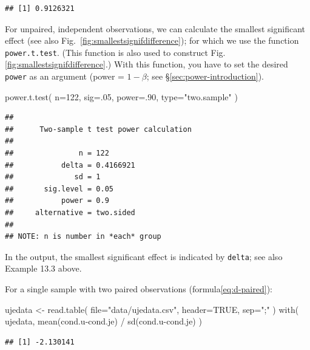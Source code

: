 \documentclass[
]{book}
\newenvironment{Shaded}{\begin{snugshade}}{\end{snugshade}}
\newcommand{\AttributeTok}[1]{\textcolor[rgb]{0.77,0.63,0.00}{#1}}
\newcommand{\ConstantTok}[1]{\textcolor[rgb]{0.00,0.00,0.00}{#1}}
\newcommand{\DecValTok}[1]{\textcolor[rgb]{0.00,0.00,0.81}{#1}}
\newcommand{\FunctionTok}[1]{\textcolor[rgb]{0.00,0.00,0.00}{#1}}
\newcommand{\NormalTok}[1]{#1}
\newcommand{\OtherTok}[1]{\textcolor[rgb]{0.56,0.35,0.01}{#1}}
\newcommand{\SpecialCharTok}[1]{\textcolor[rgb]{0.00,0.00,0.00}{#1}}
\newcommand{\StringTok}[1]{\textcolor[rgb]{0.31,0.60,0.02}{#1}}
\begin{document}
\begin{verbatim}
## [1] 0.9126321
\end{verbatim}

For unpaired, independent observations, we can calculate the smallest
significant effect (see also
Fig.~\ref{fig:smallestsignifdifference}); for which we use the function
\texttt{power.t.test}. (This function is
also used to construct Fig.\ref{fig:smallestsignifdifference}.)
With this function, you have to set the desired \texttt{power} as
an argument (power = \(1-\beta\); see
§\ref{sec:power-introduction}).

\begin{Shaded}
\begin{Highlighting}[]
\FunctionTok{power.t.test}\NormalTok{( }\AttributeTok{n=}\DecValTok{122}\NormalTok{, }\AttributeTok{sig=}\NormalTok{.}\DecValTok{05}\NormalTok{, }\AttributeTok{power=}\NormalTok{.}\DecValTok{90}\NormalTok{, }\AttributeTok{type=}\StringTok{"two.sample"}\NormalTok{ )}
\end{Highlighting}
\end{Shaded}

\begin{verbatim}
## 
##      Two-sample t test power calculation 
## 
##               n = 122
##           delta = 0.4166921
##              sd = 1
##       sig.level = 0.05
##           power = 0.9
##     alternative = two.sided
## 
## NOTE: n is number in *each* group
\end{verbatim}

In the output, the smallest significant effect is indicated by \texttt{delta}; see also
Example 13.3 above.

For a single sample with two paired observations
(formula\eqref{eq:d-paired}):

\begin{Shaded}
\begin{Highlighting}[]
\NormalTok{ujedata }\OtherTok{\textless{}{-}} \FunctionTok{read.table}\NormalTok{( }\AttributeTok{file=}\StringTok{"data/ujedata.csv"}\NormalTok{, }\AttributeTok{header=}\ConstantTok{TRUE}\NormalTok{, }\AttributeTok{sep=}\StringTok{";"}\NormalTok{ )}
\FunctionTok{with}\NormalTok{( ujedata, }\FunctionTok{mean}\NormalTok{(cond.u}\SpecialCharTok{{-}}\NormalTok{cond.je) }\SpecialCharTok{/} \FunctionTok{sd}\NormalTok{(cond.u}\SpecialCharTok{{-}}\NormalTok{cond.je) )}
\end{Highlighting}
\end{Shaded}

\begin{verbatim}
## [1] -2.130141
\end{verbatim}
\end{document}
